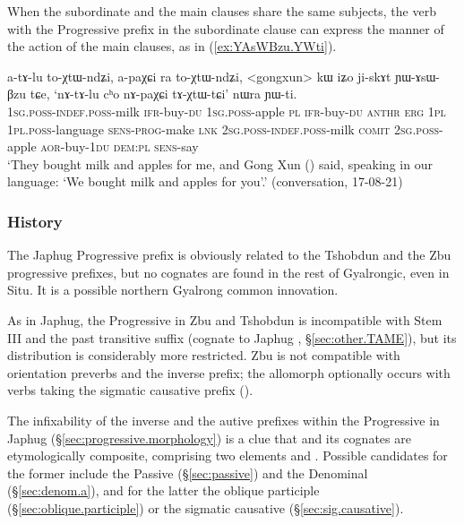 When the subordinate and the main clauses share the same subjects, the verb with the Progressive prefix in the subordinate clause can express the manner of the action of the main clauses, as in (\ref{ex:YAsWBzu.YWti}).

\begin{exe}
\ex \label{ex:YAsWBzu.YWti}
\gll a-tɤ-lu to-χtɯ-ndʑi, a-paχɕi ra to-χtɯ-ndʑi, <gongxun> kɯ iʑo ji-skɤt ɲɯ-ɤsɯ-βzu tɕe, `nɤ-tɤ-lu cʰo nɤ-paχɕi tɤ-χtɯ-tɕi' nɯra ɲɯ-ti. \\
\textsc{1sg}.\textsc{poss}-\textsc{indef}.\textsc{poss}-milk \textsc{ifr}-buy-\textsc{du} \textsc{1sg}.\textsc{poss}-apple \textsc{pl} \textsc{ifr}-buy-\textsc{du}  \textsc{anthr} \textsc{erg} \textsc{1pl} \textsc{1pl}.\textsc{poss}-language \textsc{sens}-\textsc{prog}-make \textsc{lnk} \textsc{2sg}.\textsc{poss}-\textsc{indef}.\textsc{poss}-milk \textsc{comit} \textsc{2sg}.\textsc{poss}-apple \textsc{aor}-buy-\textsc{1du} \textsc{dem}:\textsc{pl} \textsc{sens}-say  \\
\glt `They bought milk and apples for me, and Gong Xun () said, speaking in our language: `We bought milk and apples for you'.' (conversation, 17-08-21)
\end{exe}

\subsubsection{History} \label{sec:progressive.history}
The Japhug Progressive prefix  is obviously related to the Tshobdun  \citep[89]{jackson02rentongdengdi} and the Zbu  \citep[199--201]{gong18these} progressive prefixes, but no cognates are found in the rest of Gyalrongic, even in Situ. It is a possible northern Gyalrong common innovation.

As in Japhug, the Progressive  in Zbu and Tshobdun is incompatible with Stem III and the past transitive  suffix (cognate to Japhug , §\ref{sec:other.TAME}), but its distribution is considerably more restricted. Zbu  is not compatible with orientation preverbs and the inverse prefix; the allomorph  optionally occurs with verbs taking the sigmatic causative prefix (\citealt[199--200]{gong18these}).

The infixability of the inverse and the autive prefixes within the Progressive in Japhug (§\ref{sec:progressive.morphology}) is a clue that  and its cognates are etymologically composite, comprising two elements  and . Possible candidates for the former include the Passive (§\ref{sec:passive}) and the Denominal  (§\ref{sec:denom.a}), and for the latter the oblique participle  (§\ref{sec:oblique.participle}) or the sigmatic causative  (§\ref{sec:sig.causative}).


